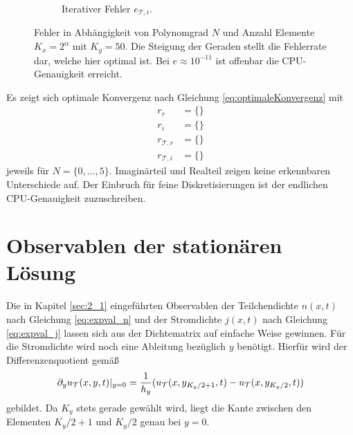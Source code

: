 \begin{figure}
\begin{subfigure}[b]{0.475\textwidth}
        \caption[]%
        {{\small Iterativer Fehler $e_{\mathcal{T},i}$.}}
    \end{subfigure}
    \caption[]
    {Fehler in Abhängigkeit von Polynomgrad $N$ und Anzahl Elemente $K_x=2^{\alpha}$ mit $K_y=50$. Die Steigung der Geraden stellt die Fehlerrate dar, welche hier optimal ist. Bei $e\approx10^{-11}$ ist offenbar die CPU-Genauigkeit erreicht.}
    \label{fig:testResult}
\end{figure}
Es zeigt sich optimale Konvergenz nach Gleichung \eqref{eq:optimaleKonvergenz} mit
\begin{align*}
  r_r &= \{\} \\
  r_i &= \{\} \\
  r_{\mathcal{T},r} &= \{\} \\
  r_{\mathcal{T},i} &= \{\}
\end{align*}
jeweils für $N=\{0,\dots,5\}$. Imaginärteil und Realteil zeigen keine erkennbaren Unterschiede auf. Der Einbruch für feine Diskretisierungen ist der endlichen CPU-Genauigkeit zuzuschreiben.

\section{Observablen der stationären Lösung}\label{sec:IV}
Die in Kapitel \ref{sec:2_1} eingeführten Observablen der Teilchendichte $n(x,t)$ nach Gleichung \eqref{eq:expval_n} und der Stromdichte $j(x,t)$ nach Gleichung \eqref{eq:expval_j} lassen sich aus der Dichtematrix auf einfache Weise gewinnen. Für die Stromdichte wird noch eine Ableitung bezüglich $y$ benötigt. Hierfür wird der Differenzenquotient gemäß
\begin{equation*}
  \partial_y u_{\mathcal{T}}(x,y,t)|_{y=0} = \frac{1}{h_y}(u_{\mathcal{T}}(x,y_{K_y/2+1},t)-u_{\mathcal{T}}(x,y_{K_y/2},t))
\end{equation*}
gebildet. Da $K_y$ stets gerade gewählt wird, liegt die Kante zwischen den Elementen $K_y/2+1$ und $K_y/2$ genau bei $y=0$.

